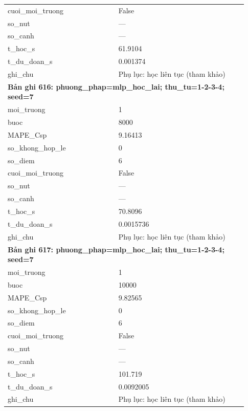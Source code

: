\begin{longtable}{p{0.43\linewidth}p{0.50\linewidth}}
cuoi\_\allowbreak moi\_\allowbreak truong & False \\
so\_\allowbreak nut & — \\
so\_\allowbreak canh & — \\
t\_\allowbreak hoc\_\allowbreak s & 61.9104 \\
t\_\allowbreak du\_\allowbreak doan\_\allowbreak s & 0.001374 \\
ghi\_\allowbreak chu & Phụ lục: học liên tục (tham khảo) \\
\midrule
\multicolumn{2}{p{0.95\linewidth}}{\textbf{Bản ghi 616: phuong\_phap=mlp\_hoc\_lai; thu\_tu=1-2-3-4; seed=7}} \\
moi\_\allowbreak truong & 1 \\
buoc & 8000 \\
MAPE\_\allowbreak Csp & 9.16413 \\
so\_\allowbreak khong\_\allowbreak hop\_\allowbreak le & 0 \\
so\_\allowbreak diem & 6 \\
cuoi\_\allowbreak moi\_\allowbreak truong & False \\
so\_\allowbreak nut & — \\
so\_\allowbreak canh & — \\
t\_\allowbreak hoc\_\allowbreak s & 70.8096 \\
t\_\allowbreak du\_\allowbreak doan\_\allowbreak s & 0.0015736 \\
ghi\_\allowbreak chu & Phụ lục: học liên tục (tham khảo) \\
\midrule
\multicolumn{2}{p{0.95\linewidth}}{\textbf{Bản ghi 617: phuong\_phap=mlp\_hoc\_lai; thu\_tu=1-2-3-4; seed=7}} \\
moi\_\allowbreak truong & 1 \\
buoc & 10000 \\
MAPE\_\allowbreak Csp & 9.82565 \\
so\_\allowbreak khong\_\allowbreak hop\_\allowbreak le & 0 \\
so\_\allowbreak diem & 6 \\
cuoi\_\allowbreak moi\_\allowbreak truong & False \\
so\_\allowbreak nut & — \\
so\_\allowbreak canh & — \\
t\_\allowbreak hoc\_\allowbreak s & 101.719 \\
t\_\allowbreak du\_\allowbreak doan\_\allowbreak s & 0.0092005 \\
ghi\_\allowbreak chu & Phụ lục: học liên tục (tham khảo) \\

\end{longtable}
